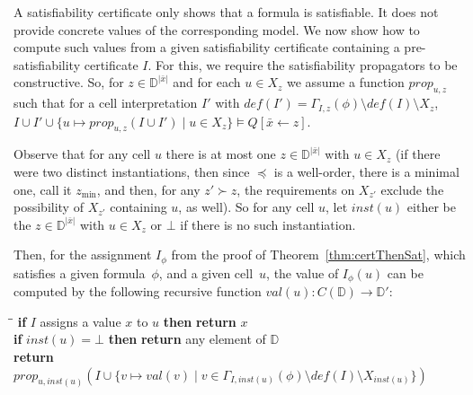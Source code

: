 \documentclass[runningheads]{llncs}
\newcommand{\numvar}[1]{|#1|}
\newcommand{\domain}{\mathbb{D}}
\newcommand{\codomain}{\mathbb{D}'}
\newcommand{\subst}[3]{#1[#2\leftarrow #3]}
\newcommand{\repr}[1]{\hat{#1}}
\newcommand{\marek}[1]{\todo[color=red!10]{#1 -MD}}
\begin{document}
A satisfiability certificate only shows that a formula is satisfiable. It does not provide concrete values of the corresponding model. We now show how to compute such values from a given satisfiability certificate containing a pre-satisfiability certificate $I$. For this, we require the satisfiability propagators to be constructive. So, for $z\in\domain^{\numvar{\bar{x}}}$ and for each $u\in X_z$ we assume a function $prop_{u,z}$ such that for
a cell interpretation $I'$ with $\mathit{def}(I')=\Gamma_{I,z}(\phi)\setminus \mathit{def}(I)\setminus X_z$, $I\cup I'\cup \{ u \mapsto prop_{u,z}(I\cup I') \mid u\in{X_z}\}\models\subst{Q}{\bar{x}}{\repr{z}}$.
 



Observe that for any cell $u$ there is at most one $z\in\domain^{\numvar{\bar{x}}}$ with $u\in X_z$ (if there were two distinct instantiations, then since $\preceq$ is a well-order, there is a minimal one, call it $z_{\min}$, and then, for any $z'\succ z$, the requirements on $X_{z'}$ exclude the possibility of $X_{z'}$ containing $u$, as well). So for any cell $u$, let $\mathit{inst}(u)$ either be the $z\in\domain^{\numvar{\bar{x}}}$ with $u\in X_z$ or $\bot$ if there is no such instantiation.

Then, for the assignment $I_\phi$ from the proof of Theorem~\ref{thm:certThenSat}, which satisfies a given formula~$\phi$, and a given cell~$u$, the value of $I_\phi(u)$ can be computed by the following recursive function $val(u): C(\domain)\rightarrow \codomain$:
\begin{tabbing}\hspace*{0.4cm}\=\hspace*{0.4cm}\=\kill
	\textbf{if} $I$ assigns a value $x$ to $u$ \textbf{then} \textbf{return} $x$\\
	\textbf{if} $\mathit{inst}(u)=\bot$ \textbf{then} \textbf{return} any element of $\domain$\\
	\textbf{return} $prop_{u,\mathit{inst}(u)}(I\cup \{ v\mapsto val(v) \mid v\in \Gamma_{I,\mathit{inst}(u)}(\phi)\setminus \mathit{def}(I)\setminus X_{\mathit{inst}(u)}\})$
\end{tabbing}
\end{document}
